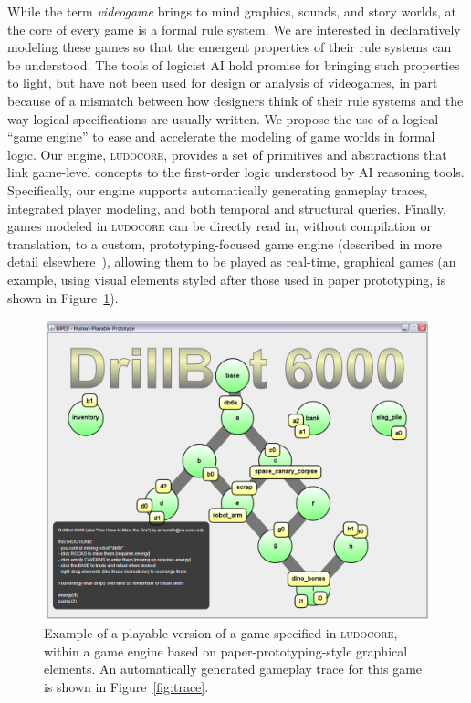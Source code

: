 \documentclass[conference]{IEEEtran}
\newcommand{\ludocore}{\textsc{ludocore}}
\begin{document}
While the term \emph{videogame} brings to mind graphics, sounds, and story
worlds, at the core of every game is a formal rule system. We are interested in
declaratively modeling these games so that the emergent properties of their
rule systems can be understood. The tools of logicist AI hold promise for
bringing such properties to light, but have not been used for design or
analysis of videogames, in part because of a mismatch between how designers
think of their rule systems and the way logical specifications are usually
written. We propose the use of a logical ``game engine'' to ease and accelerate
the modeling of game worlds in formal logic. Our engine, \ludocore, provides a
set of primitives and abstractions that link game-level concepts to the
first-order logic understood by AI reasoning tools. Specifically, our engine
supports automatically generating gameplay traces, integrated player modeling,
and both temporal and structural queries. Finally, games modeled in \ludocore{}
can be directly read in, without compilation or translation, to a custom,
prototyping-focused game engine (described in more detail
elsewhere~\citep{AIIDE09}), allowing them to be played as real-time, graphical
games (an example, using visual elements styled after those used in paper
prototyping, is shown in Figure~\ref{fig:biped}).

\begin{figure}
\includegraphics[width=\columnwidth]{db6k_screenshot.png}
\caption{Example of a playable version of a game specified in \ludocore, within
a game engine based on paper-prototyping-style graphical elements. An
automatically generated gameplay trace for this game is shown in
Figure~\ref{fig:trace}.}
\label{fig:biped}
\end{figure}
\end{document}
